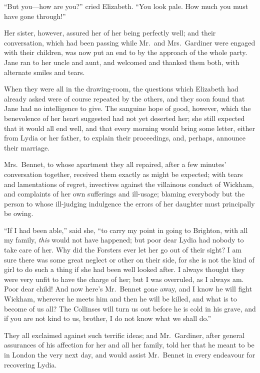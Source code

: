 ``But you---how are you?'' cried Elizabeth.  ``You look pale.
How much you must have gone through!''

Her sister, however, assured her of her being perfectly well;
and their conversation, which had been passing while Mr.\ and
Mrs.\ Gardiner were engaged with their children, was now put an
end to by the approach of the whole party.  Jane ran to her uncle
and aunt, and welcomed and thanked them both, with alternate
smiles and tears.

When they were all in the drawing-room, the questions which
Elizabeth had already asked were of course repeated by the
others, and they soon found that Jane had no intelligence
to give.  The sanguine hope of good, however, which the
benevolence of her heart suggested had not yet deserted her;
she still expected that it would all end well, and that every
morning would bring some letter, either from Lydia or her
father, to explain their proceedings, and, perhaps, announce
their marriage.

Mrs.\ Bennet, to whose apartment they all repaired, after a few
minutes' conversation together, received them exactly as might
be expected; with tears and lamentations of regret, invectives
against the villainous conduct of Wickham, and complaints of
her own sufferings and ill-usage; blaming everybody but the
person to whose ill-judging indulgence the errors of her
daughter must principally be owing.

``If I had been able,'' said she, ``to carry my point in going to
Brighton, with all my family, \emph{this} would not have happened;
but poor dear Lydia had nobody to take care of her.  Why did
the Forsters ever let her go out of their sight?  I am sure there
was some great neglect or other on their side, for she is not the
kind of girl to do such a thing if she had been well looked after.
I always thought they were very unfit to have the charge of her;
but I was overruled, as I always am.  Poor dear child!  And
now here's Mr.\ Bennet gone away, and I know he will fight
Wickham, wherever he meets him and then he will be killed, and
what is to become of us all?  The Collinses will turn us out
before he is cold in his grave, and if you are not kind to us,
brother, I do not know what we shall do.''

They all exclaimed against such terrific ideas; and Mr.\ Gardiner,
after general assurances of his affection for her and all her
family, told her that he meant to be in London the very next day,
and would assist Mr.\ Bennet in every endeavour for recovering
Lydia.

